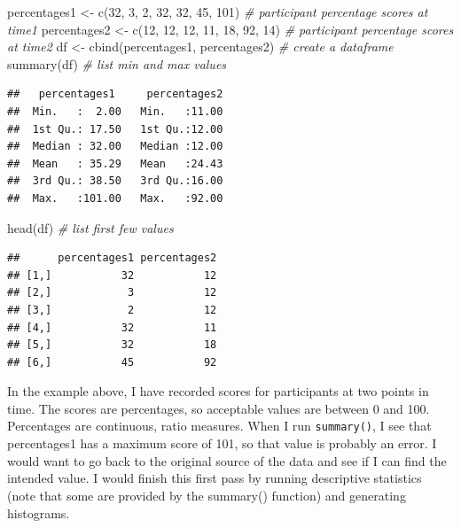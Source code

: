 \documentclass[
]{book}
\newenvironment{Shaded}{\begin{snugshade}}{\end{snugshade}}
\newcommand{\CommentTok}[1]{\textcolor[rgb]{0.56,0.35,0.01}{\textit{#1}}}
\newcommand{\DecValTok}[1]{\textcolor[rgb]{0.00,0.00,0.81}{#1}}
\newcommand{\FunctionTok}[1]{\textcolor[rgb]{0.00,0.00,0.00}{#1}}
\newcommand{\NormalTok}[1]{#1}
\newcommand{\OtherTok}[1]{\textcolor[rgb]{0.56,0.35,0.01}{#1}}
\begin{document}
\begin{Shaded}
\begin{Highlighting}[]
\NormalTok{percentages1 }\OtherTok{\textless{}{-}} \FunctionTok{c}\NormalTok{(}\DecValTok{32}\NormalTok{, }\DecValTok{3}\NormalTok{, }\DecValTok{2}\NormalTok{, }\DecValTok{32}\NormalTok{, }\DecValTok{32}\NormalTok{, }\DecValTok{45}\NormalTok{, }\DecValTok{101}\NormalTok{) }\CommentTok{\# participant percentage scores at time1}
\NormalTok{percentages2 }\OtherTok{\textless{}{-}} \FunctionTok{c}\NormalTok{(}\DecValTok{12}\NormalTok{, }\DecValTok{12}\NormalTok{, }\DecValTok{12}\NormalTok{, }\DecValTok{11}\NormalTok{, }\DecValTok{18}\NormalTok{, }\DecValTok{92}\NormalTok{, }\DecValTok{14}\NormalTok{) }\CommentTok{\# participant percentage scores at time2}
\NormalTok{df }\OtherTok{\textless{}{-}} \FunctionTok{cbind}\NormalTok{(percentages1, percentages2) }\CommentTok{\# create a dataframe}
\FunctionTok{summary}\NormalTok{(df) }\CommentTok{\# list min and max values}
\end{Highlighting}
\end{Shaded}

\begin{verbatim}
##   percentages1     percentages2  
##  Min.   :  2.00   Min.   :11.00  
##  1st Qu.: 17.50   1st Qu.:12.00  
##  Median : 32.00   Median :12.00  
##  Mean   : 35.29   Mean   :24.43  
##  3rd Qu.: 38.50   3rd Qu.:16.00  
##  Max.   :101.00   Max.   :92.00
\end{verbatim}

\begin{Shaded}
\begin{Highlighting}[]
\FunctionTok{head}\NormalTok{(df) }\CommentTok{\# list first few values}
\end{Highlighting}
\end{Shaded}

\begin{verbatim}
##      percentages1 percentages2
## [1,]           32           12
## [2,]            3           12
## [3,]            2           12
## [4,]           32           11
## [5,]           32           18
## [6,]           45           92
\end{verbatim}

In the example above, I have recorded scores for participants at two points in time. The scores are percentages, so acceptable values are between 0 and 100. Percentages are continuous, ratio measures. When I run \texttt{summary()}, I see that percentages1 has a maximum score of 101, so that value is probably an error. I would want to go back to the original source of the data and see if I can find the intended value. I would finish this first pass by running descriptive statistics (note that some are provided by the summary() function) and generating histograms.
\end{document}
